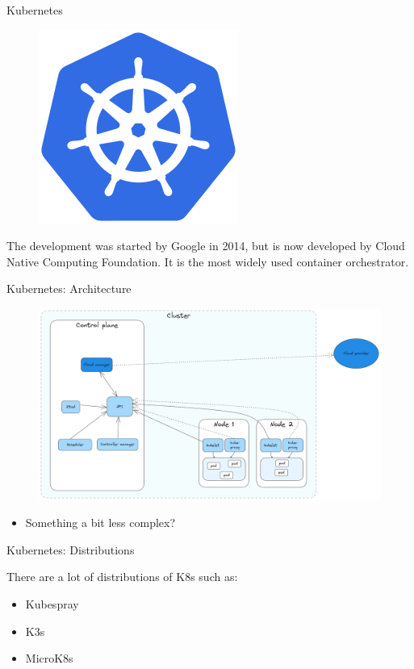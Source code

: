 \begin{frame}{Kubernetes}
\begin{figure}
    \centering
    \includegraphics[width=0.2\linewidth]{static/Kubernetes_logo_without_workmark.svg.png}
\end{figure}
 The development was started by Google in 2014, but is now developed by Cloud Native Computing Foundation. 
It is the most widely used container orchestrator.

\end{frame}

\begin{frame}{Kubernetes: Architecture}

\begin{figure}
    \centering
    \includegraphics[width=1\linewidth]{static/Untitled-2023-09-27-1503(3).png}
\end{figure}

\begin{itemize}
    \item<2-> Something a bit less complex?
\end{itemize}

\end{frame}

\begin{frame}{Kubernetes: Distributions}

There are a lot of distributions of K8s such as:

\begin{itemize}
    \item Kubespray 
    \item K3s 
    \item MicroK8s 
\end{itemize}

\end{frame}

